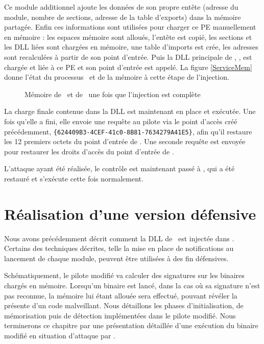Ce module additionnel ajoute les données de son propre entête (adresse du module, nombre de sections, adresse de la table d'exports) dans la mémoire partagée.
Enfin ces informations sont utilisées pour charger ce PE manuellement en mémoire : les espaces mémoire sont alloués, l'entête est copié, les sections et les DLL liées sont chargées en mémoire, une table d'imports est crée, les adresses sont recalculées à partir de son point d'entrée.
Puis la DLL principale de \duqu, \netpDLL, est chargée et liée à ce PE et son point d'entrée est appelé.
La figure \ref{ServiceMem} donne l'état du processus \services\ et de la mémoire à cette étape de l'injection.

\begin{figure}[h]
\begin{center}
{}
\end{center}
\caption{Mémoire de \services\ et de \duqu\ une fois que l'injection est complète}
\label{fig:ServiceMem}
\end{figure}

La charge finale contenue dans la DLL est maintenant en place et exécutée.
Une fois qu'elle a fini, elle envoie une requête au pilote via le point d'accès créé précédemment, \texttt{\{624409B3-4CEF-41c0-8B81-7634279A41E5\}}, afin qu'il restaure les 12 premiers octets du point d'entrée de \services.
Une seconde requête est envoyée pour restaurer les droits d'accès du point d'entrée de \services.

L'attaque ayant été réalisée, le contrôle est maintenant passé à \services, qui a été restauré et s'exécute cette fois normalement.

\section{Réalisation d'une version défensive}
Nous avons précédemment décrit comment la DLL de \duqu\ est injectée dans \services.
Certains des techniques décrites, telle la mise en place de notifications au lancement de chaque module, peuvent être utilisées à des fin défensives.

Schématiquement, le pilote modifié va calculer des signatures sur les binaires chargés en mémoire.
Lorsqu'un binaire est lancé, dans la cas où sa signature n'est pas reconnue, la mémoire lui étant allouée sera effectué, pouvant révéler la présente d'un code malveillant.
Nous détaillons les phases d'initialisation, de mémorisation puis de détection implémentées dans le pilote modifié.
Nous terminerons ce chapitre par une présentation détaillée d'une exécution du binaire modifié en situation d'attaque par \duqu.

